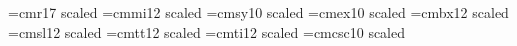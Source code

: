  
\ifx\tenpoint\undefined\let\loadedfrommacro=Y
         
         \let\loadedfrommacro=N\fi
 
\ifx\fourteenpoint\undefined
         
         \fi
 
\font\twentyrm=cmr17 scaled 
\font\twentyi=cmmi12 scaled 
\font\twentysy=cmsy10 scaled 
\font\twentyex=cmex10 scaled 
\font\twentybf=cmbx12 scaled 
\font\twentysl=cmsl12 scaled 
\font\twentytt=cmtt12 scaled 
\font\twentyit=cmti12 scaled 
\font\twentycsc=cmcsc10 scaled 
 
\ifx\twentypoint\undefined
   \def\twentypoint{\def\rm{\fam0\twentyrm}%
       \textfont0=\twentyrm \scriptfont0=\fourteenrm \scriptscriptfont0=\tenrm
       \textfont1=\twentyi  \scriptfont1=\fourteeni  \scriptscriptfont1=\teni
       \textfont2=\twentysy \scriptfont2=\fourteensy \scriptscriptfont2=\tensy
       \textfont3=\twentyex \scriptfont3=\twentyex
                              \scriptscriptfont3=\twentyex
       \textfont\itfam=\twentyit  \def\it{\fam\itfam\twentyit}%
       \textfont\slfam=\twentysl  \def\sl{\fam\slfam\twentysl}%
       \textfont\ttfam=\twentytt  \def\tt{\fam\ttfam\twentytt}%
       \textfont\bffam=\twentybf  \scriptfont\bffam=\fourteenbf
        \scriptscriptfont\bffam=\tenbf  \def\bf{\fam\bffam\twentybf}%
       \textfont\scfam=\twentycsc \def\sc{\fam\scfam\twentycsc}%
       \normalbaselineskip=25pt
       \setbox\strutbox=\hbox{\vrule height20pt depth5pt width0pt}%
       \normalbaselines\rm}
   \fi
